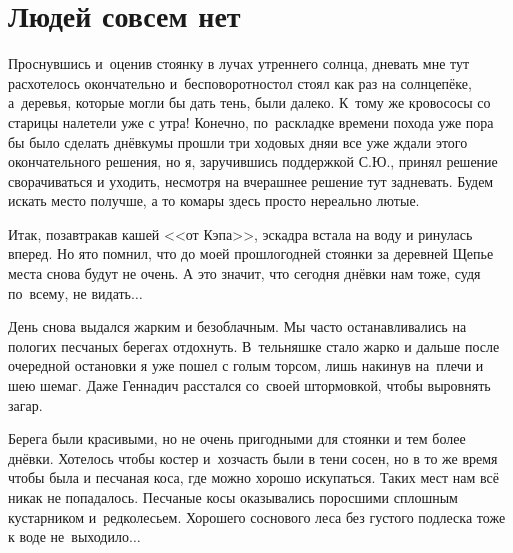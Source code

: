 \chapter{Людей совсем нет} 
\vepsianrose

Проснувшись и~оценив стоянку в лучах утреннего солнца, дневать мне тут расхотелось окончательно и~бесповоротно\mdash стол стоял как раз на солнцепёке, а~деревья, которые могли бы дать тень, были далеко. К~тому же кровососы со старицы налетели уже с утра! Конечно, по~раскладке времени похода уже пора бы было сделать днёвку\mdash мы прошли три ходовых дня\mdash и все уже ждали этого окончательного решения, но я, заручившись поддержкой С.Ю., принял решение сворачиваться и уходить, несмотря на вчерашнее решение тут задневать. Будем искать место получше, а то комары здесь просто нереально лютые.

Итак, позавтракав кашей <<от Кэпа>>, эскадра встала на воду и ринулась вперед. Но я\sdash то помнил, что до моей прошлогодней стоянки за деревней Щепье места снова будут не очень. А это значит, что сегодня днёвки нам тоже, судя по~всему, не видать$\ldots$ 

\newpage
День снова выдался жарким и безоблачным. Мы часто останавливались на пологих песчаных берегах отдохнуть. В~тельняшке стало жарко и дальше после очередной остановки я уже пошел с голым торсом, лишь накинув на~плечи и шею шемаг. Даже Геннадич расстался со~своей штормовкой, чтобы выровнять загар. 

Берега были красивыми, но не очень пригодными для стоянки и тем более днёвки. Хотелось чтобы костер и~хозчасть были в тени сосен, но в то же время чтобы была и песчаная коса, где можно хорошо искупаться. Таких мест нам всё никак не попадалось. Песчаные косы оказывались поросшими сплошным кустарником и~редколесьем. Хорошего соснового леса без густого подлеска тоже к воде не~выходило$\ldots$ 

